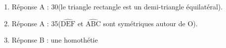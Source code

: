 
\medskip 

%
%
%
%
%
\begin{enumerate}
\item Réponse A : 30\degres (le triangle rectangle est un demi-triangle équilatéral).
\item Réponse A : 35\degres ($\widehat{\text{DEF}}$ et  $\widehat{\text{ABC}}$ sont symétriques autour de O).
\item Réponse B : une homothétie
\end{enumerate}

\medskip

